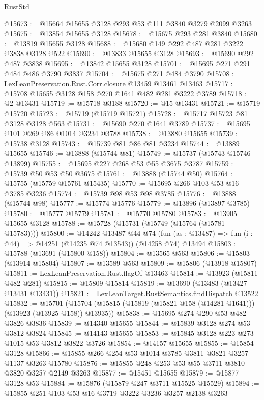 \begin{lexlean}{RustStd}
\begin{coremodule}
@15673 := @15664 @15655 @3128 @293 @53 @111 @3840 @3279 @2099 @3263
@15675 := @13854 @15655 @3128
@15678 := @15675 @293 @281 @3840
@15680 := @13819 @15655 @3128
@15688 := @15680 @149 @292 @487 @281 @3222 @3838 @3128 @522
@15690 := @13833 @15655 @3128
@15693 := @15690 @292 @487 @3838
@15695 := @13842 @15655 @3128
@15701 := @15695 @271 @291 @484 @486 @3790 @3837
@15704 := @15675 @271 @484 @3790
@15708 := LexLeanPreservation.Rust.Corr.closure @13459 @13461 @13463
@15717 := @15708 @15655 @3128 @158 @270 @1641 @482 @281 @3222 @3789
@15718 := @2 @13431
@15719 := @15718 @3188
@15720 := @15 @13431
@15721 := @15719 @15720
@15723 := @15719 (@15719 @15721)
@15728 := @15717 @15723 @81 @3128 @3128 @563
@15731 := @15690 @270 @1641 @3789
@15737 := @15695 @101 @269 @86 @1014 @3234 @3788
@15738 := @13880 @15655
@15739 := @15738 @3128
@15743 := @15739 @81 @86 @81 @3234
@15744 := @13889 @15655
@15746 := @13888 (@15744 @81)
@15749 := @15737 (@15743 @15746 @13899)
@15755 := @15695 @227 @268 @53 @55 @3675 @3787
@15759 := @15739 @50 @53 @50 @3675
@15761 := @13888 (@15744 @50)
@15764 := @15755 (@15759 @15761 @15435)
@15770 := @15695 @266 @103 @53 @16 @3785 @3236
@15774 := @15739 @98 @53 @98 @3785
@15776 := @13888 (@15744 @98)
@15777 := @15774 @15776
@15779 := @13896 (@13897 @3785)
@15780 := @15777 @15779
@15781 := @15770 @15780
@15783 := @13905 @15655 @3128
@15788 := @15728 (@15731 (@15749 (@15764 (@15781 @15783))))
@15800 := @14242
    @13487
    @44
    @74
    (fun (as : @13487) => fun (i : @44) => @14251 (@14235 @74 @13543))
    (@14258 @74)
    @13494
@15803 := @15788 (@13691 (@15800 @158))
@15804 := @13565 @563
@15806 := @15803 (@13914 @15804)
@15807 := @13589 @563
@15809 := @15806 (@13918 @15807)
@15811 := LexLeanPreservation.Rust.flagOf @13463
@15814 := @13923 (@15811 @482 @281)
@15815 := @15809 @15814
@15819 := @13690 (@13483 (@13427 @13431 @13431))
@15821 := LexLeanTarget.RustSemantics.findDispatch @13522
@15832 := @15701
    (@15704 (@15815 (@15819 (@15821 @158 (@14281 @1641))) (@13923 (@13925 @158)) @13935))
@15838 := @15695 @274 @290 @53 @482 @3826 @3836
@15839 := @14340 @15655
@15844 := @15839 @3128 @274 @53 @3812 @3824
@15845 := @14143 @15655
@15853 := @15845 @3128 @223 @273 @1015 @53 @3812 @3822 @3726
@15854 := @14157 @15655
@15855 := @15854 @3128
@15866 := @15855 @266 @254 @53 @1014 @3785 @3811 @3821 @3257 @1137 @3263 @15780
@15876 := @15855 @248 @253 @53 @55 @3711 @3810 @3820 @3257 @2149 @3263
@15877 := @15451 @15655
@15879 := @15877 @3128 @53
@15884 := @15876 (@15879 @247 @3711 @15525 @15529)
@15894 := @15855 @251 @103 @53 @16 @3719 @3222 @3236 @3257 @2138 @3263

\end{coremodule}
\end{lexlean}

